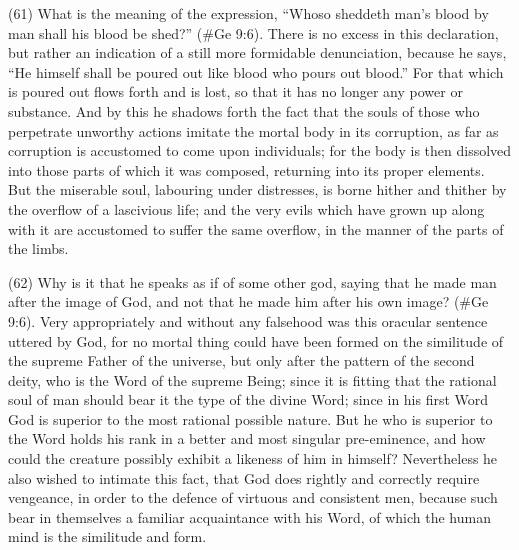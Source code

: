(61) What is the meaning of the expression, ``Whoso sheddeth man's blood by man shall his blood
be shed?'' (\#Ge 9:6). There is no excess in this declaration, but rather an indication of a still
more formidable denunciation, because he says, ``He himself shall be poured out like blood who
pours out blood.'' For that which is poured out flows forth and is lost, so that it has no longer any
power or substance. And by this he shadows forth the fact that the souls of those who perpetrate
unworthy actions imitate the mortal body in its corruption, as far as corruption is accustomed to
come upon individuals; for the body is then dissolved into those parts of which it was composed,
returning into its proper elements. But the miserable soul, labouring under distresses, is borne
hither and thither by the overflow of a lascivious life; and the very evils which have grown up along
with it are accustomed to suffer the same overflow, in the manner of the parts of the limbs.

(62) Why is it that he speaks as if of some other god, saying that he made man after the image of
God, and not that he made him after his own image? (\#Ge 9:6). Very appropriately and without
any falsehood was this oracular sentence uttered by God, for no mortal thing could have been
formed on the similitude of the supreme Father of the universe, but only after the pattern of the
second deity, who is the Word of the supreme Being; since it is fitting that the rational soul of man
should bear it the type of the divine Word; since in his first Word God is superior to the most
rational possible nature. But he who is superior to the Word holds his rank in a better and most
singular pre-eminence, and how could the creature possibly exhibit a likeness of him in himself?
Nevertheless he also wished to intimate this fact, that God does rightly and correctly require
vengeance, in order to the defence of virtuous and consistent men, because such bear in
themselves a familiar acquaintance with his Word, of which the human mind is the similitude and
form.

